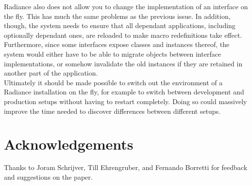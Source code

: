 \documentclass{sig-alternate}
\begin{document}
Radiance also does not allow you to change the implementation of an interface on the fly. This has much the same problems as the previous issue. In addition, though, the system needs to ensure that all dependant applications, including optionally dependant ones, are reloaded to make macro redefinitions take effect. Furthermore, since some interfaces expose classes and instances thereof, the system would either have to be able to migrate objects between interface implementations, or somehow invalidate the old instances if they are retained in another part of the application. \\

Ultimately it should be made possible to switch out the environment of a Radiance installation on the fly, for example to switch between development and production setups without having to restart completely. Doing so could massively improve the time needed to discover differences between different setups.

\section{Acknowledgements}
Thanks to Joram Schrijver, Till Ehrengruber, and Fernando Borretti for feedback and suggestions on the paper.


\end{document}
